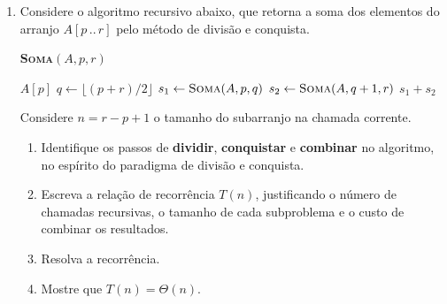 \documentclass[9pt,a4paper]{extarticle}
\begin{document}
\begin{enumerate}
\begin{enumerate}[label=(\alph*)]
    \textit{Sugestão: para cada valor de $i$, conte quantos valores de $j$ são considerados e some sobre $i$. Use a identidade $\sum_{i=1}^{n-1} (n - i) = \dfrac{n(n-1)}{2}$.}

    \item Construa a tabela de custos no estilo CLRS para o pior caso e escreva $T_{\text{pior}}(n)$ como soma dos termos $c_i$ ponderados por suas frequências.
    \item Mostre que $T_{\text{pior}}(n) = \Theta(n^2)$, exibindo as constantes da definição assintótica.
    \item Descreva o \textbf{melhor caso} do algoritmo: quantas execuções da linha 3 ocorrem? Qual é a classe assintótica de $T_{\text{melhor}}(n)$?
\end{enumerate}

  \item Considere o algoritmo recursivo abaixo, que retorna a soma dos elementos do arranjo $A[p\,..\,r]$ pelo método de divisão e conquista.

    \begin{center}
    \begin{minipage}{0.7\textwidth}
    \textbf{\textsc{Soma}}$(A, p, r)$
    \begin{algorithmic}[1]
            \State \Return $A[p]$
        \EndIf
        \State $q \gets \lfloor (p + r) / 2 \rfloor$
        \State $s_1 \gets \textsc{Soma}(A, p, q)$
        \State $s_2 \gets \textsc{Soma}(A, q + 1, r)$
        \State \Return $s_1 + s_2$
    \end{algorithmic}
    \end{minipage}
    \end{center}

    Considere $n = r - p + 1$ o tamanho do subarranjo na chamada corrente.

    \begin{enumerate}[label=(\alph*)]
        \item Identifique os passos de \textbf{dividir}, \textbf{conquistar} e \textbf{combinar} no algoritmo, no espírito do paradigma de divisão e conquista.
        \item Escreva a relação de recorrência $T(n)$, justificando o número de chamadas recursivas, o tamanho de cada subproblema e o custo de combinar os resultados.
        \item Resolva a recorrência.
        \item Mostre que $T(n) = \Theta(n)$.
    \end{enumerate}
\end{enumerate}
\end{document}
